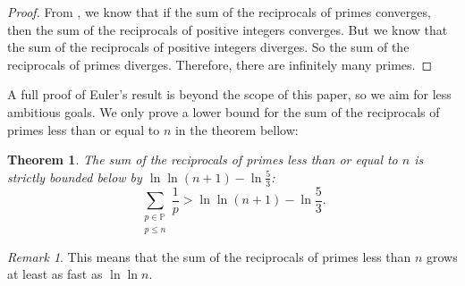 \documentclass[a4paper]{article}
\newtheorem{theorem}{Theorem}[section]
\theoremstyle{definition}
\theoremstyle{remark}
\newtheorem*{remark}{Remark}
\begin{document}
\begin{proof}
  From , we know that if the sum of the reciprocals of primes converges, then the sum of the reciprocals of positive integers converges. But we know that the sum of the reciprocals of positive integers diverges. So the sum of the reciprocals of primes diverges. Therefore, there are infinitely many primes.
\end{proof}
A full proof of Euler's result is beyond the scope of this paper, so we aim for less ambitious goals. We only prove a lower bound for the sum of the reciprocals of primes less than or equal to $n$ in the theorem bellow:

\begin{theorem}
  The sum of the reciprocals of primes less than or equal to $n$ is strictly bounded below by $\ln\ln(n+1)-\ln\frac{5}{3}$:
  \[
  \sum_{\substack{p\in\mathbb{P}\\p\le n}}\frac{1}{p}>\ln\ln(n+1)-\ln\frac{5}{3}
  .
  \]
  \label{thm:sumReciprocalPrimeLnLn}
\end{theorem}
\begin{remark}
  This means that the sum of the reciprocals of primes less than $n$ grows at least as fast as $\ln\ln n$.
  \label{rem:sumReciprocalPrimeLnLn}
\end{remark}
\end{document}
